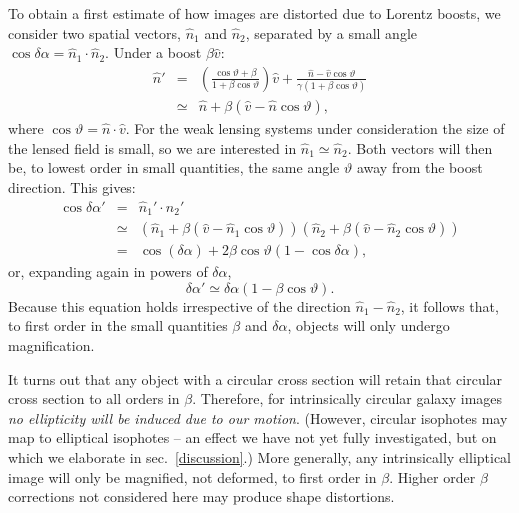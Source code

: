 \documentclass[useAMS,fleqn,usenatbib]{mn2e}
\begin{document}
To obtain a first estimate of how images are distorted due to Lorentz boosts, we 
consider two spatial vectors, $\hat{n}_1$ and $\hat{n}_2$, separated by a small 
angle $\cos\delta\alpha = \hat{n}_1\cdot\hat{n}_2$. Under a boost $\beta \hat{v}$:
\begin{eqnarray}
    \hat{n}' & = &
    \left( \frac{\cos\vartheta+\beta}{1+\beta \cos\vartheta} \right) \hat{v}
    + \frac{\hat{n}-\hat{v}\cos\vartheta}{\gamma(1+\beta\cos\vartheta)} \\
    & \simeq & \hat{n} + \beta \left( \hat{v} - \hat{n}\cos\vartheta \right),
\end{eqnarray}
where $\cos\vartheta = \hat{n}\cdot\hat{v}$.  For the weak lensing systems under consideration
the size of the lensed field is small, so we are interested in  $\hat{n}_1 \simeq \hat{n}_2$.
Both vectors will then be, to lowest order in small quantities, 
the same angle $\vartheta$ away from the boost direction. 
This gives:
\begin{eqnarray}
    \cos\delta\alpha'& \!\!\!\!\!=\!\!\!\!\! & \hat{n}_1'\cdot\hat{n}_2' \\
    &\!\!\!\!\! \simeq \!\!\!\!\!& \left( \hat{n}_1 + \beta \left( \hat{v} - \hat{n}_1\cos\vartheta \right) \right)
    \left( \hat{n}_2 + \beta \left( \hat{v} - \hat{n}_2\cos\vartheta \right) \right) \\
    &\!\!\!\!\! =\!\!\!\!\! & \cos(\delta\alpha) + 2\beta\cos\vartheta\left( 1-\cos\delta\alpha \right),
\end{eqnarray}
or, expanding again in powers of $\delta\alpha$,
\begin{equation}
    \delta\alpha' \simeq \delta\alpha \left( 1 - \beta\cos\vartheta \right).
\end{equation}
Because this equation holds irrespective of the direction $\hat{n}_1-\hat{n}_2$, it follows that,
to first order in the small quantities $\beta$ and $\delta\alpha$,
objects will only undergo magnification.


It turns out that any object with a circular cross section
will retain that circular cross section to all orders in $\beta$.
Therefore, for intrinsically circular galaxy images  {\it{no ellipticity will 
be induced due to our motion}}.
(However, circular isophotes may map to elliptical isophotes -- an effect
we have not yet fully investigated, but on which we elaborate in sec.~\ref{discussion}.)
More generally,  any intrinsically elliptical image will only be magnified, 
not deformed, to first order in $\beta$. Higher order
$\beta$ corrections not considered here may produce shape 
distortions. 
\end{document}
